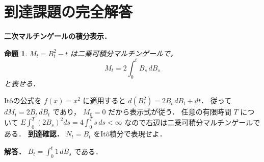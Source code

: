 \documentclass[a5paper,10pt,onecolumn]{jsarticle}
\makeatletter
\theoremstyle{mathnotetheorem}
\newtheorem{proposition}[theorem]{命題}
\renewcommand{\proofname}{証明}
\renewenvironment{proof}[1][\proofname]{%
  \par\pushQED{\qed}\normalfont\topsep4\p@\@plus2\p@\relax
  \trivlist\item[\hskip\labelsep\bfseries #1]\ignorespaces
}{\popQED\endtrivlist\@endpefalse}
\makeatother
\begin{document}
\section{到達課題の完全解答}
\noindent\textbf{二次マルチンゲールの積分表示．}
\begin{proposition}
$M_t=B_t^2-t$ は二乗可積分マルチンゲールで，
\[
M_t=2\int_0^tB_s\,dB_s
\]
と表せる．
\end{proposition}
\begin{proof}
Itôの公式を $f(x)=x^2$ に適用すると
$d(B_t^2)=2B_t\,dB_t+dt$．
従って $dM_t=2B_t\,dB_t$ であり，
$M_0=0$ だから表示式が従う．
任意の有限時間 $T$ について
$E\int_0^T(2B_s)^2ds=4\int_0^Ts\,ds<\infty$
なので右辺は二乗可積分マルチンゲールである．
\end{proof}
\noindent\textbf{到達確認．}
$N_t=B_t$ をItô積分で表現せよ．
\par\noindent\textbf{解答．}
$B_t=\int_0^t1\,dB_s$ である．
\end{document}
